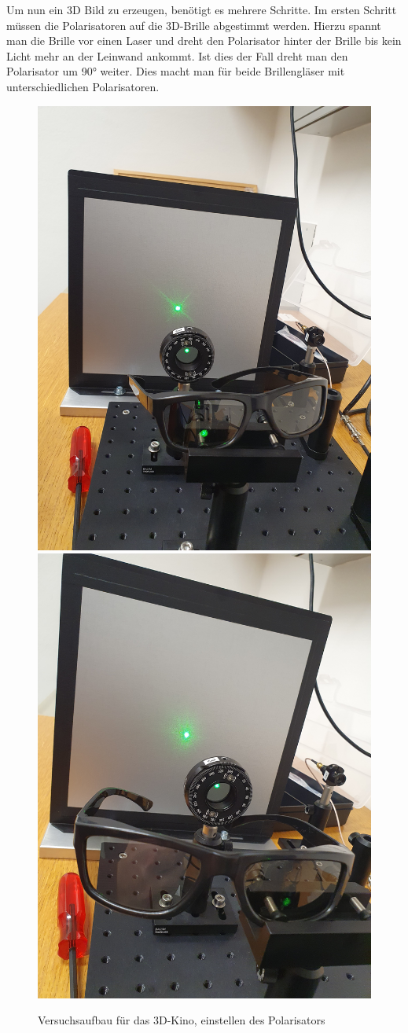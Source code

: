 \documentclass[12pt,a4paper,twoside]{article}
\begin{document}
\noindent
Um nun ein 3D Bild zu erzeugen, benötigt es mehrere Schritte. 
Im ersten Schritt müssen die Polarisatoren auf die 3D-Brille abgestimmt werden.
Hierzu spannt man die Brille vor einen Laser und dreht den Polarisator hinter der Brille bis kein Licht mehr an der Leinwand ankommt. 
Ist dies der Fall dreht man den Polarisator um 90° weiter. Dies macht man für beide Brillengläser mit unterschiedlichen Polarisatoren. 

\begin{figure}[H]
    \centering
    \includegraphics[width=0.6\linewidth, angle=-90]{nudes/brille rechts.jpg}
    \includegraphics[width=0.6\linewidth, angle=-90]{nudes/brille links.jpg}
    \caption{Versuchsaufbau für das 3D-Kino, einstellen des Polarisators}
    \label{fig:3D Brille polarisator aufbau}
\end{figure}
\end{document}
